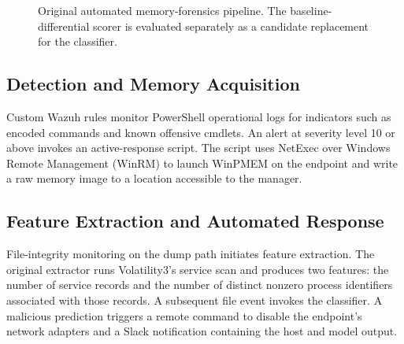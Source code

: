 \documentclass[conference]{IEEEtran}
\begin{document}
\begin{figure}[t]
\centering
{}
\caption{Original automated memory-forensics pipeline. The baseline-differential
scorer is evaluated separately as a candidate replacement for the classifier.}
\label{fig:architecture}
\end{figure}

\subsection{Detection and Memory Acquisition}
Custom Wazuh rules monitor PowerShell operational logs for indicators such as
encoded commands and known offensive cmdlets. An alert at severity level 10 or
above invokes an active-response script. The script uses NetExec over Windows
Remote Management (WinRM) to launch WinPMEM on the endpoint and write a raw
memory image to a location accessible to the manager.

\subsection{Feature Extraction and Automated Response}
File-integrity monitoring on the dump path initiates feature extraction.
The original extractor runs Volatility3's service scan and produces two
features: the number of service records and the number of distinct nonzero
process identifiers associated with those records. A subsequent file event
invokes the classifier. A malicious prediction triggers a remote command to
disable the endpoint's network adapters and a Slack notification containing the host
and model output.
\end{document}
